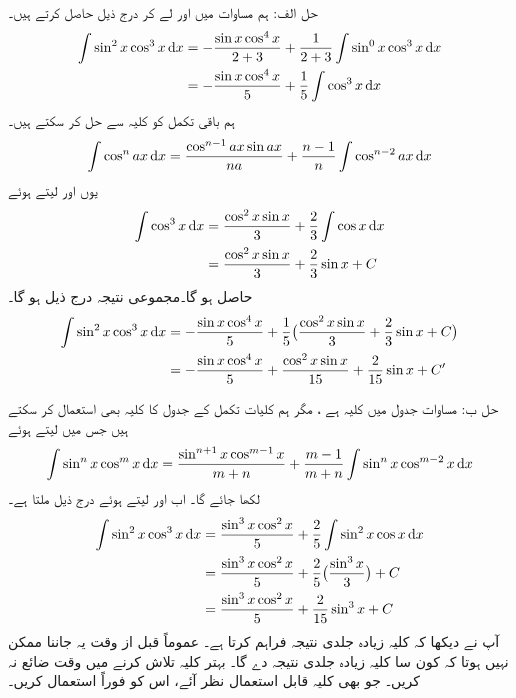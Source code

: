 حل الف:\quad
ہم مساوات  میں  اور  لے کر درج ذیل حاصل کرتے ہیں۔
\begin{align*}
\int \sin^2x\cos^3x\dif x&=-\frac{\sin x\cos^4x}{2+3}+\frac{1}{2+3}\int\sin^0x\cos^3x\dif x\\
&=-\frac{\sin x\cos^4x}{5}+\frac{1}{5}\int\cos^3x\dif x
\end{align*}
ہم باقی تکمل کو کلیہ  سے حل کر سکتے ہیں۔
\begin{align*}
\int\cos^nax\dif x=\frac{\cos^{n-1}ax\sin ax}{na}+\frac{n-1}{n}\int\cos^{n-2}ax\dif x
\end{align*}
یوں  اور  لیتے ہوئے
 \begin{align*}
\int\cos^3x\dif x&=\frac{\cos^2x\sin x}{3}+\frac{2}{3}\int\cos x\dif x\\
&=\frac{\cos^2x\sin x}{3}+\frac{2}{3}\sin x+C
\end{align*}
حاصل ہو گا۔مجموعی نتیجہ درج ذیل ہو گا۔
\begin{align*}
\int\sin^2x\cos^3x\dif x &=-\frac{\sin x\cos^4x}{5}+\frac{1}{5}\big(\frac{\cos^2x\sin x}{3}+\frac{2}{3}\sin x+C\big)\\
&=-\frac{\sin x\cos^4 x}{5}+\frac{\cos^2x\sin x}{15}+\frac{2}{15}\sin x+C'
\end{align*}

حل ب:\quad
مساوات  جدول میں کلیہ  ہے ، مگر ہم کلیات تکمل کے جدول کا کلیہ  بھی استعمال کر سکتے ہیں جس میں  لیتے ہوئے
\begin{align*}
\int \sin^nx\cos^mx\dif x=\frac{\sin^{n+1}x\cos^{m-1}x}{m+n}+\frac{m-1}{m+n}\int \sin^nx\cos^{m-2}x\dif x
\end{align*}
لکھا جائے گا۔ اب  اور  لیتے ہوئے درج ذیل ملتا ہے۔
\begin{align*}
\int\sin^2x\cos^3x\dif x&=\frac{\sin^3x\cos^2x}{5}+\frac{2}{5}\int\sin^2x\cos x\dif x\\
&=\frac{\sin^3x\cos^2x}{5}+\frac{2}{5}\big(\frac{\sin^3x}{3}\big)+C\\
&=\frac{\sin^3x\cos^2x}{5}+\frac{2}{15}\sin^3x+C
\end{align*} 
آپ نے دیکھا کہ کلیہ   زیادہ جلدی نتیجہ فراہم کرتا ہے۔ عموماً قبل از وقت یہ جاننا ممکن نہیں ہوتا  کہ کون سا کلیہ زیادہ جلدی نتیجہ دے گا۔ بہتر کلیہ تلاش کرنے  میں  وقت ضائع نہ کریں۔ جو بھی کلیہ قابل استعمال نظر آئے، اس کو فوراً استعمال کریں۔

